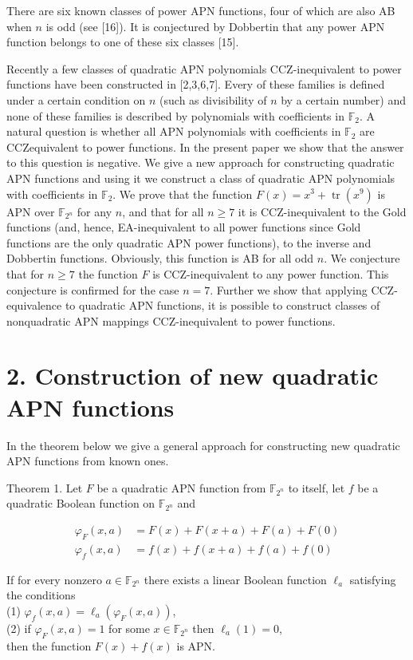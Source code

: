 \documentclass[10pt]{article}
\begin{document}
There are six known classes of power APN functions, four of which are also AB when $n$ is odd (see [16]). It is conjectured by Dobbertin that any power APN function belongs to one of these six classes [15].

Recently a few classes of quadratic APN polynomials CCZ-inequivalent to power functions have been constructed in [2,3,6,7]. Every of these families is defined under a certain condition on $n$ (such as divisibility of $n$ by a certain number) and none of these families is described by polynomials with coefficients in $\mathbb{F}_{2}$. A natural question is whether all APN polynomials with coefficients in $\mathbb{F}_{2}$ are CCZequivalent to power functions. In the present paper we show that the answer to this question is negative. We give a new approach for constructing quadratic APN functions and using it we construct a class of quadratic APN polynomials with coefficients in $\mathbb{F}_{2}$. We prove that the function $F(x)= x^{3}+\operatorname{tr}\left(x^{9}\right)$ is APN over $\mathbb{F}_{2^{n}}$ for any $n$, and that for all $n \geqslant 7$ it is CCZ-inequivalent to the Gold functions (and, hence, EA-inequivalent to all power functions since Gold functions are the only quadratic APN power functions), to the inverse and Dobbertin functions. Obviously, this function is AB for all odd $n$. We conjecture that for $n \geqslant 7$ the function $F$ is CCZ-inequivalent to any power function. This conjecture is confirmed for the case $n=7$. Further we show that applying CCZ-equivalence to quadratic APN functions, it is possible to construct classes of nonquadratic APN mappings CCZ-inequivalent to power functions.

\section*{2. Construction of new quadratic APN functions}
In the theorem below we give a general approach for constructing new quadratic APN functions from known ones.

Theorem 1. Let $F$ be a quadratic APN function from $\mathbb{F}_{2^{n}}$ to itself, let $f$ be a quadratic Boolean function on $\mathbb{F}_{2^{n}}$ and

$$
\begin{aligned}
\varphi_{F}(x, a) & =F(x)+F(x+a)+F(a)+F(0) \\
\varphi_{f}(x, a) & =f(x)+f(x+a)+f(a)+f(0)
\end{aligned}
$$

If for every nonzero $a \in \mathbb{F}_{2^{n}}$ there exists a linear Boolean function $\ell_{a}$ satisfying the conditions\\
(1) $\varphi_{f}(x, a)=\ell_{a}\left(\varphi_{F}(x, a)\right)$,\\
(2) if $\varphi_{F}(x, a)=1$ for some $x \in \mathbb{F}_{2^{n}}$ then $\ell_{a}(1)=0$,\\
then the function $F(x)+f(x)$ is APN.
\end{document}
